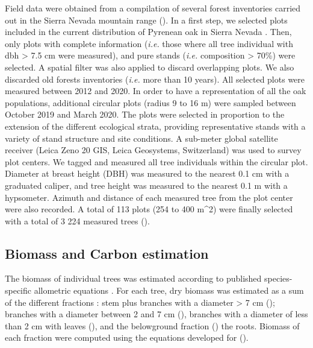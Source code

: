 Field data were obtained from a compilation of several forest inventories carried out in the Sierra Nevada mountain range (). In a first step, we selected plots included in the current distribution of Pyrenean oak in Sierra Nevada \autocite{PerezLuqueetal2019MapEcosystems}. Then, only plots with complete information (\emph{i.e.} those where all tree individual with dbh \textgreater{} 7.5 cm were measured), and pure stands (\emph{i.e.} \Qp composition \textgreater{} 70\%) were selected. A spatial filter was also applied to discard overlapping plots. We also discarded old forests inventories (\emph{i.e.} more than 10 years). All selected plots were measured between 2012 and 2020. In order to have a representation of all the oak populations, additional circular plots (radius 9 to 16 m) were sampled between October 2019 and March 2020. The plots were selected in proportion to the extension of the different ecological strata, providing representative stands with a variety of stand structure and site conditions. A sub-meter global satellite receiver (Leica Zeno 20 GIS, Leica Geosystems, Switzerland) was used to survey plot centers. We tagged and measured all tree individuals within the circular plot. Diameter at breast height (DBH) was measured to the nearest 0.1 cm with a graduated caliper, and tree height was measured to the nearest 0.1 m with a hypsometer. Azimuth and distance of each measured tree from the plot center were also recorded. A total of 113 plots (254 to 400 m\^{}2) were finally selected with a total of 3 224 measured trees ().

\subsection{Biomass and Carbon estimation}\label{sec:carbon:mat-biomass}

The biomass of individual trees was estimated according to published species-specific allometric equations \autocite{RuizPeinadoetal2012BiomassModels}. For each tree, dry biomass was estimated as a sum of the different fractions \autocite{CarvalhoParresol2003AdditivityTree}: stem plus branches with a diameter \textgreater{} 7 cm (\ws); branches with a diameter between 2 and 7 cm (\wbs), branches with a diameter of less than 2 cm with leaves (\wb), and the belowground fraction (\wro) the roots. Biomass of each fraction were computed using the equations developed for \Qp \autocite{RuizPeinadoetal2012BiomassModels} ().

